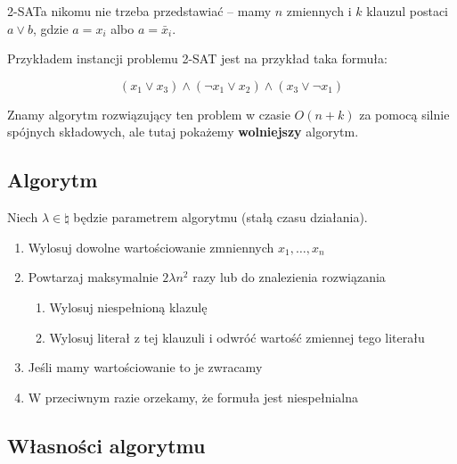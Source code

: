 2-SATa nikomu nie trzeba przedstawiać -- mamy \( n \) zmiennych i \( k \) klauzul postaci \( a \lor b \), gdzie \( a = x_i \) albo \( a = \bar x_i \).

Przykładem instancji problemu 2-SAT jest na przykład taka formuła:

\[ 
    (x_1 \lor x_3) \land (\neg x_1 \lor x_2) \land (x_3 \lor \neg x_1)
\]

Znamy algorytm rozwiązujący ten problem w czasie \( O(n + k) \) za pomocą silnie spójnych składowych, ale tutaj pokażemy \textbf{wolniejszy} algorytm.

\subsection{Algorytm}
\label{2-sat-algorithm}
Niech \( \lambda \in \natural \) będzie parametrem algorytmu (stałą czasu działania).
\begin{enumerate}
    \item Wylosuj dowolne wartościowanie zmniennych \( x_1, \dots, x_n \)
    \item Powtarzaj maksymalnie \( 2\lambda n^2 \) razy lub do znalezienia rozwiązania
    \begin{enumerate}
        \item Wylosuj niespełnioną klazulę
        \item Wylosuj literał z tej klauzuli i odwróć wartość zmiennej tego literału
    \end{enumerate}
    \item Jeśli mamy wartościowanie to je zwracamy
    \item W przeciwnym razie orzekamy, że formuła jest niespełnialna
\end{enumerate}

\subsection{Własności algorytmu}


